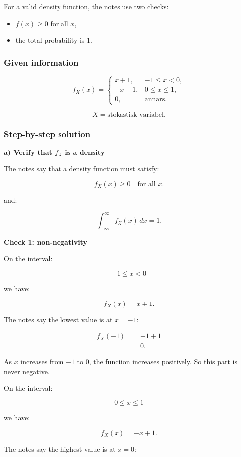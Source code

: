 \documentclass[10pt]{article}
\begin{document}
For a valid density function, the notes use two checks:
\begin{itemize}
\item \(f(x)\ge 0\) for all \(x\),
\item the total probability is \(1\).
\end{itemize}

\subsubsection*{Given information}
\[
f_X(x)=
\begin{cases}
x+1, & -1\le x<0,\\
-x+1, & 0\le x\le 1,\\
0, & \text{annars}.
\end{cases}
\]

\[
X=\text{stokastisk variabel}.
\]

\subsubsection*{Step-by-step solution}

\textbf{a) Verify that \(f_X\) is a density}

The notes say that a density function must satisfy:

\[
f_X(x)\ge 0
\quad \text{for all }x.
\]

and:

\[
\int_{-\infty}^{\infty} f_X(x)\,dx=1.
\]

\textbf{Check 1: non-negativity}

On the interval:

\[
-1\le x<0
\]

we have:

\[
f_X(x)=x+1.
\]

The notes say the lowest value is at \(x=-1\):

\begin{align*}
f_X(-1)
&=-1+1 \\[2mm]
&=0.
\end{align*}

As \(x\) increases from \(-1\) to \(0\),
the function increases positively.
So this part is never negative.

On the interval:

\[
0\le x\le 1
\]

we have:

\[
f_X(x)=-x+1.
\]

The notes say the highest value is at \(x=0\):
\end{document}
